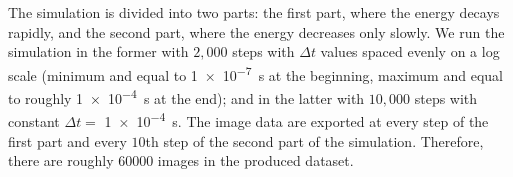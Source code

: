 \documentclass[11pt, authoryear]{elsarticle}
\begin{document}
\begin{appendix}
		The simulation is divided into two parts: the first part, where the energy decays 
		rapidly, and the second part, where the energy decreases only slowly. 
		We run the simulation in the former with $2,000$ steps with $\Delta t$ values spaced evenly on a log scale (minimum and equal to \SI{1e-7}{\second} at the beginning, maximum and equal to roughly \SI{1e-4}{\second} at the end); and in the latter with $10,000$ steps with constant $\Delta t =$ \SI{1e-4}{\second}. The image data are exported at every step of the first part and every $10$th step of the second part of the simulation. Therefore, there are roughly $60000$ images in the produced dataset.
		
		
		

\end{appendix}
\end{document}
